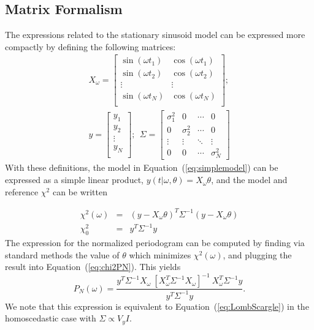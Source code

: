\documentclass{emulateapj}
\newcommand{\Eq}[1]{Equation~(\ref{eq:#1})}
\newcommand{\eq}[1]{\Eq{#1}}
\newcommand{\eqlabel}[1]{\label{eq:#1}}
\begin{document}
\subsection{Matrix Formalism}
The expressions related to the stationary sinusoid model can be expressed more compactly by defining the following matrices:
\begin{eqnarray}
X_\omega = \left[
\begin{array}{cc}
\sin(\omega t_1) & \cos(\omega t_1)\\
\sin(\omega t_2) & \cos(\omega t_2)\\
\vdots & \vdots \\
\sin(\omega t_N) & \cos(\omega t_N)\\
\end{array}
\right]; \nonumber\\
y = \left[
\begin{array}{c}
y_1 \\
y_2\\
\vdots \\
y_N\\
\end{array}
\right];~~
\Sigma = \left[
\begin{array}{cccc}
\sigma_1^2 & 0 &  \cdots & 0\\
0 & \sigma_2^2 &  \cdots & 0\\
\vdots & \vdots &  \ddots & \vdots\\
0 & 0 &  \cdots & \sigma_N^2
\end{array}
\right]
\end{eqnarray}
With these definitions, the model in \eq{simplemodel} can be expressed as a simple linear product, $y(t|\omega,\theta) = X_\omega\theta$, and the model and reference $\chi^2$ can be written

\begin{eqnarray}
  \chi^2(\omega) &=& (y - X_\omega\theta)^T\Sigma^{-1}(y - X_\omega\theta)\\
  \chi^2_0 &=& y^T \Sigma^{-1} y
\end{eqnarray}
The expression for the normalized periodogram can be computed by finding via standard methods the value of $\theta$ which minimizes $\chi^2(\omega)$, and plugging the result into \eq{chi2PN}. This yields
\begin{equation}
  \eqlabel{LombScargle2}
  P_N(\omega) = \frac{y^T\Sigma^{-1}X_\omega~[X_\omega^T\Sigma^{-1}X_\omega]^{-1}~X_\omega^T\Sigma^{-1}y}{y^T\Sigma^{-1}y}.
\end{equation}
We note that this expression is equivalent to \eq{LombScargle} in the homoscedastic case with $\Sigma \propto V_y I$.
\end{document}
